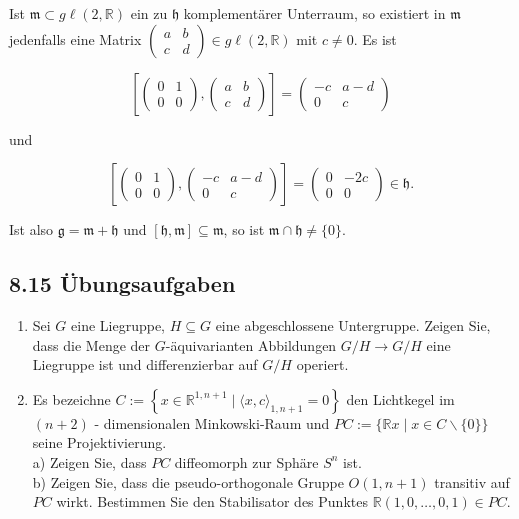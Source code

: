 \documentclass[10pt, letterpaper]{article}
\begin{document}
Ist $\mathfrak{m} \subset g \ell(2, \mathbb{R})$ ein zu $\mathfrak{h}$ komplementärer Unterraum, so existiert in $\mathfrak{m}$ jedenfalls eine Matrix $\left(\begin{array}{ll}a & b \\ c & d\end{array}\right) \in g \ell(2, \mathbb{R})$ mit $c \neq 0$. Es ist

$$
\left[\left(\begin{array}{ll}
0 & 1 \\
0 & 0
\end{array}\right),\left(\begin{array}{ll}
a & b \\
c & d
\end{array}\right)\right]=\left(\begin{array}{cc}
-c & a-d \\
0 & c
\end{array}\right)
$$

und

$$
\left[\left(\begin{array}{cc}
0 & 1 \\
0 & 0
\end{array}\right),\left(\begin{array}{cc}
-c & a-d \\
0 & c
\end{array}\right)\right]=\left(\begin{array}{cc}
0 & -2 c \\
0 & 0
\end{array}\right) \in \mathfrak{h} .
$$

Ist also $\mathfrak{g}=\mathfrak{m}+\mathfrak{h}$ und $[\mathfrak{h}, \mathfrak{m}] \subseteq \mathfrak{m}$, so ist $\mathfrak{m} \cap \mathfrak{h} \neq\{0\}$.

\subsection*{8.15 Übungsaufgaben}
\begin{enumerate}
  \item Sei $G$ eine Liegruppe, $H \subseteq G$ eine abgeschlossene Untergruppe. Zeigen Sie, dass die Menge der $G$-äquivarianten Abbildungen $G / H \rightarrow G / H$ eine Liegruppe ist und differenzierbar auf $G / H$ operiert.
  \item Es bezeichne $C:=\left\{x \in \mathbb{R}^{1, n+1} \mid\langle x, c\rangle_{1, n+1}=0\right\}$ den Lichtkegel im $(n+2)$ - dimensionalen Minkowski-Raum und $P C:=\{\mathbb{R} x \mid x \in C \backslash\{0\}\}$ seine Projektivierung.\\
a) Zeigen Sie, dass $P C$ diffeomorph zur Sphäre $S^{n}$ ist.\\
b) Zeigen Sie, dass die pseudo-orthogonale Gruppe $O(1, n+1)$ transitiv auf $P C$ wirkt. Bestimmen Sie den Stabilisator des Punktes $\mathbb{R}(1,0, \ldots, 0,1) \in P C$.
\end{enumerate}
\end{document}
